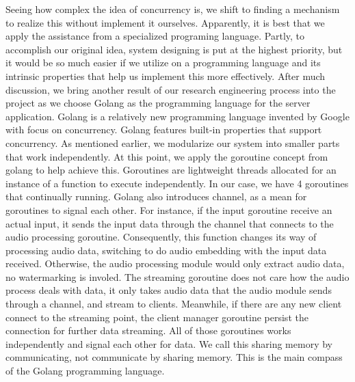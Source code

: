 \documentclass[conference]{IEEEtran}
\begin{document}
Seeing how complex the idea of concurrency is, we shift to finding a mechanism to realize this without implement it ourselves. Apparently, it is best that we apply the assistance from a specialized programing language. Partly, to accomplish our original idea, system designing is put at the highest priority, but it would be so much easier if we utilize on a programming language and its intrinsic properties that help us implement this more effectively. After much discussion, we bring another result of our research engineering process into the project as we choose Golang as the programming language for the server application. Golang is a relatively new programming language invented by Google with focus on concurrency. Golang features built-in properties that support concurrency. As mentioned earlier, we modularize our system into smaller parts that work independently. At this point, we apply the goroutine concept from golang to help achieve this. Goroutines are lightweight threads allocated for an instance of a function to execute independently. In our case, we have 4 goroutines that continually running. Golang also introduces channel, as a mean for goroutines to signal each other. For instance, if the input goroutine receive an actual input, it sends the input data through the channel that connects to the audio processing goroutine. Consequently, this function changes its way of processing audio data, switching to do audio embedding with the input data received. Otherwise, the audio processing module would only extract audio data, no watermarking is involed. The streaming goroutine does not care how the audio process deals with data, it only takes audio data that the audio module sends through a channel, and stream to clients. Meanwhile, if there are any new client connect to the streaming point, the client manager goroutine persist the connection for further data streaming. All of those goroutines works independently and signal each other for data. We call this sharing memory by communicating, not communicate by sharing memory. This is the main compass of the Golang programming language. 
\end{document}

